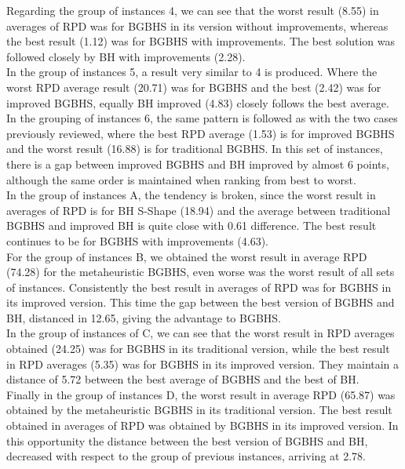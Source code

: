 Regarding the group of instances 4, we can see that the worst result (8.55) in averages of RPD was for BGBHS in its version without improvements, whereas the best result (1.12) was for BGBHS with improvements. The best solution was followed closely by BH with improvements (2.28).\\

In the group of instances 5, a result very similar to 4 is produced. Where the worst RPD average result (20.71) was for BGBHS and the best (2.42) was for improved BGBHS, equally BH improved (4.83) closely follows the best average.\\

In the grouping of instances 6, the same pattern is followed as with the two cases previously reviewed, where the best RPD average (1.53) is for improved BGBHS and the worst result (16.88) is for traditional BGBHS. In this set of instances, there is a gap between improved BGBHS and BH improved by almost 6 points, although the same order is maintained when ranking from best to worst.\\

In the group of instances A, the tendency is broken, since the worst result in averages of RPD is for BH S-Shape (18.94) and the average between traditional BGBHS and improved BH is quite close with 0.61 difference. The best result continues to be for BGBHS with improvements (4.63).\\

For the group of instances B, we obtained the worst result in average RPD (74.28) for the metaheuristic BGBHS, even worse was the worst result of all sets of instances. Consistently the best result in averages of RPD was for BGBHS in its improved version. This time the gap between the best version of BGBHS and BH, distanced in 12.65, giving the advantage to BGBHS.\\

In the group of instances of C, we can see that the worst result in RPD averages obtained (24.25) was for BGBHS in its traditional version, while the best result in RPD averages (5.35) was for BGBHS in its improved version. They maintain a distance of 5.72 between the best average of BGBHS and the best of BH.\\

Finally in the group of instances D, the worst result in average RPD (65.87) was obtained by the metaheuristic BGBHS in its traditional version. The best result obtained in averages of RPD was obtained by BGBHS in its improved version. In this opportunity the distance between the best version of BGBHS and BH, decreased with respect to the group of previous instances, arriving at 2.78.\\








